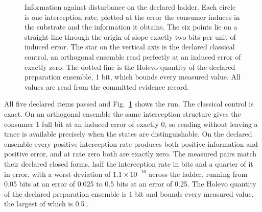 \documentclass[aps,pre,reprint,nofootinbib]{revtex4-2}
\begin{document}
\begin{figure}[t]
\centering
{}
\caption{Information against disturbance on the declared ladder.  Each
circle is one interception rate, plotted at the error the consumer
induces in the substrate and the information it obtains.  The six
points lie on a straight line through the origin of slope exactly two
bits per unit of induced error.  The star on the vertical axis is the
declared classical control, an orthogonal ensemble read perfectly at
an induced error of exactly zero.  The dotted line is the
Holevo quantity of the declared preparation ensemble, 1 bit, which
bounds every measured value.  All values are read from the committed
evidence record.}
\label{fig:cr6}
\end{figure}

All five declared items passed and Fig.~\ref{fig:cr6} shows the run.
The classical control is exact.  On an orthogonal ensemble the same
interception structure gives the consumer 1 full bit at an induced
error of exactly 0, so reading without leaving a trace is available
precisely when the states are distinguishable.  On the declared
ensemble every positive interception rate produces both positive
information and positive error, and at rate zero both are exactly
zero.  The measured pairs match their declared closed forms, half the
interception rate in bits and a quarter of it in error, with a worst
deviation of $1.1 \times 10^{-16}$ across the ladder, running from
0.05 bits at an error of 0.025 to 0.5 bits at an error of 0.25.  The
Holevo quantity of the declared preparation ensemble is 1 bit and
bounds every measured value, the largest of which is 0.5
\cite{Holevo1973}.
\end{document}
